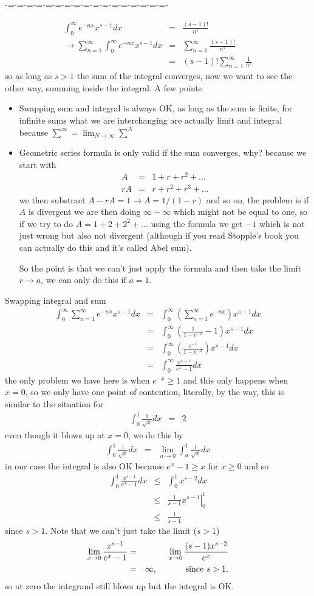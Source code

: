 \documentclass[aps,preprint,preprintnumbers,nofootinbib,showpacs,prd]{revtex4-1}
\newcommand{\bit}{\begin{itemize}}
\newcommand{\eit}{\end{itemize}}
\newcommand{\nbea}{\begin{eqnarray*}}
\newcommand{\neea}{\end{eqnarray*}}
\begin{document}
-=-=-=-=-=-=-=-=-=-=-=-=-=-=-=-=-=-

%
\nbea
\int_0^\infty e^{-nx} x^{s-1} dx & = & \frac{(s-1)!}{n^s} \\
\to \sum_{n=1}^\infty \int_0^\infty e^{-nx} x^{s-1} dx & = & \sum_{n=1}^\infty \frac{(s-1)!}{n^s} \\
& = & (s-1)!\sum_{n=1}^\infty \frac{1}{n^s}
\neea
%
so as long as $s > 1$ the sum of the integral converges, now we want to see the other way, summing inside the integral. A few points
%
\bit
\item Swapping sum and integral is always OK, as long as the sum is finite, for infinite sums what we are interchanging are actually limit and integral because $\sum^\infty = \lim_{N\to\infty}\sum^N$
%
\item Geometric series formula is only valid if the sum converges, why? because we start with
%
\nbea
A & = & 1 + r + r^2 + \dots \\
rA & = & r + r^2 + r^3 + \dots
\neea
%
we then substract $A - rA = 1\to A = 1/(1-r)$ and so on, the problem is if $A$ is divergent we are then doing $\infty - \infty$ which might not be equal to one, so if we try to do $A = 1 + 2 + 2^2 + \dots$ using the formula we get $-1$ which is not just wrong but also not divergent (although if you read Stopple's book you can actually do this and it's called Abel sum).

So the point is that we can't just apply the formula and then take the limit $r\to a$, we can only do this if $a = 1$.
\eit
%

Swapping integral and sum
%
\nbea
\int_0^\infty \sum_{n=1}^\infty e^{-nx} x^{s-1} dx & = & \int_0^\infty \left(\sum_{n=1}^\infty e^{-nx}\right) x^{s-1} dx \\
& = & \int_0^\infty \left (\frac{1}{1-e^{-x}} - 1 \right ) x^{s-1} dx \\
& = & \int_0^\infty \left (\frac{e^{-x}}{1-e^{-x}}\right ) x^{s-1} dx \\
& = & \int_0^\infty \frac{x^{s-1}}{e^{x} - 1} dx
\neea
%
the only problem we have here is when $e^{-x} \ge 1$ and this only happens when $x = 0$, so we only have one point of contention, literally, by the way, this is similar to the situation for
%
\nbea
\int_0^1 \frac{1}{\sqrt{x}} dx & = & 2
\neea
%
even though it blows up at $x = 0$, we do this by
%
\nbea
\int_0^1 \frac{1}{\sqrt{x}} dx & = & \lim_{a\to0}\int_a^1 \frac{1}{\sqrt{x}} dx
\neea
%
in our case the integral is also OK because $e^x - 1 \ge x$ for $x \ge 0$ and so
%
\nbea
\int_0^1 \frac{x^{s-1}}{e^{x} - 1} dx & \le & \int_0^1 x^{s-2} dx \\
& \le & \left. \frac{1}{s-1} x^{s-1} \right |_0^1 \\
& \le & \frac{1}{s-1}
\neea
%
since $s > 1$. Note that we can't just take the limit ($s > 1$)
%
\nbea
\lim_{x\to0} \frac{x^{s-1}}{e^x-1} & = & \lim_{x\to0} \frac{(s-1)x^{s-2}}{e^x} \\
& = & \infty, ~~~~~~~~~~{\rm  since~} s > 1.
\neea
%
so at zero the integrand still blows up but the integral is OK.
\end{document}
